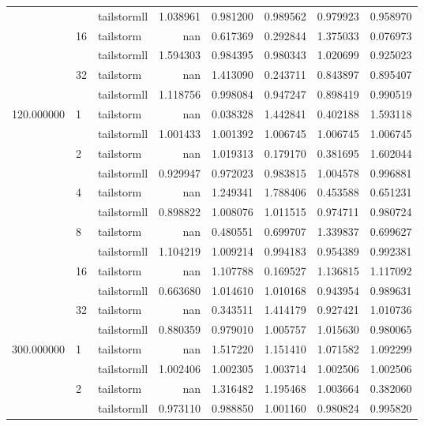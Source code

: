 \begin{tabular}{lllrrrrr}
 &  & tailstormll & 1.038961 & 0.981200 & 0.989562 & 0.979923 & 0.958970 \\
 & \multirow[c]{2}{*}{16} & tailstorm & nan & 0.617369 & 0.292844 & 1.375033 & 0.076973 \\
 &  & tailstormll & 1.594303 & 0.984395 & 0.980343 & 1.020699 & 0.925023 \\
 & \multirow[c]{2}{*}{32} & tailstorm & nan & 1.413090 & 0.243711 & 0.843897 & 0.895407 \\
 &  & tailstormll & 1.118756 & 0.998084 & 0.947247 & 0.898419 & 0.990519 \\
\multirow[c]{12}{*}{120.000000} & \multirow[c]{2}{*}{1} & tailstorm & nan & 0.038328 & 1.442841 & 0.402188 & 1.593118 \\
 &  & tailstormll & 1.001433 & 1.001392 & 1.006745 & 1.006745 & 1.006745 \\
 & \multirow[c]{2}{*}{2} & tailstorm & nan & 1.019313 & 0.179170 & 0.381695 & 1.602044 \\
 &  & tailstormll & 0.929947 & 0.972023 & 0.983815 & 1.004578 & 0.996881 \\
 & \multirow[c]{2}{*}{4} & tailstorm & nan & 1.249341 & 1.788406 & 0.453588 & 0.651231 \\
 &  & tailstormll & 0.898822 & 1.008076 & 1.011515 & 0.974711 & 0.980724 \\
 & \multirow[c]{2}{*}{8} & tailstorm & nan & 0.480551 & 0.699707 & 1.339837 & 0.699627 \\
 &  & tailstormll & 1.104219 & 1.009214 & 0.994183 & 0.954389 & 0.992381 \\
 & \multirow[c]{2}{*}{16} & tailstorm & nan & 1.107788 & 0.169527 & 1.136815 & 1.117092 \\
 &  & tailstormll & 0.663680 & 1.014610 & 1.010168 & 0.943954 & 0.989631 \\
 & \multirow[c]{2}{*}{32} & tailstorm & nan & 0.343511 & 1.414179 & 0.927421 & 1.010736 \\
 &  & tailstormll & 0.880359 & 0.979010 & 1.005757 & 1.015630 & 0.980065 \\
\multirow[c]{12}{*}{300.000000} & \multirow[c]{2}{*}{1} & tailstorm & nan & 1.517220 & 1.151410 & 1.071582 & 1.092299 \\
 &  & tailstormll & 1.002406 & 1.002305 & 1.003714 & 1.002506 & 1.002506 \\
 & \multirow[c]{2}{*}{2} & tailstorm & nan & 1.316482 & 1.195468 & 1.003664 & 0.382060 \\
 &  & tailstormll & 0.973110 & 0.988850 & 1.001160 & 0.980824 & 0.995820 \\

\end{tabular}
